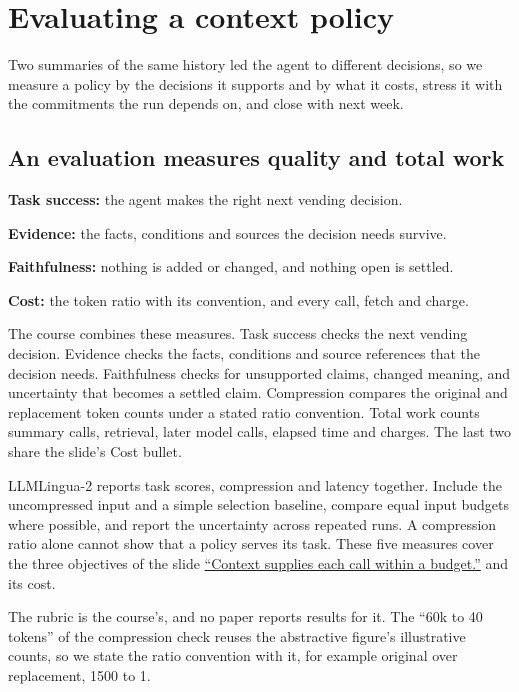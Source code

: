 \section{Evaluating a context policy}
\label{sec:row-4}

Two summaries of the same history led the agent to different decisions, so we measure a policy by the decisions it supports and by what it costs, stress it with the commitments the run depends on, and close with next week.

\subsection{An evaluation measures quality and total work}
\label{sec:it-10-1}

\bi
\item \textbf{Task success:} the agent makes the right next vending decision.
\item \textbf{Evidence:} the facts, conditions and sources the decision needs survive.
\item \textbf{Faithfulness:} nothing is added or changed, and nothing open is settled.
\item \textbf{Cost:} the token ratio with its convention, and every call, fetch and charge.
\ei

The course combines these measures. Task success checks the next vending decision. Evidence checks the facts, conditions and source references that the decision needs. Faithfulness checks for unsupported claims, changed meaning, and uncertainty that becomes a settled claim. Compression compares the original and replacement token counts under a stated ratio convention. Total work counts summary calls, retrieval, later model calls, elapsed time and charges. The last two share the slide's Cost bullet.

LLMLingua-2 reports task scores, compression and latency together. Include the uncompressed input and a simple selection baseline, compare equal input budgets where possible, and report the uncertainty across repeated runs. A compression ratio alone cannot show that a policy serves its task. These five measures cover the three objectives of the slide \hyperref[sec:it-5-1]{``Context supplies each call within a budget.''} and its cost.

The rubric is the course's, and no paper reports results for it. The ``60k to 40 tokens'' of the compression check reuses the abstractive figure's illustrative counts, so we state the ratio convention with it, for example original over replacement, 1500 to 1.

